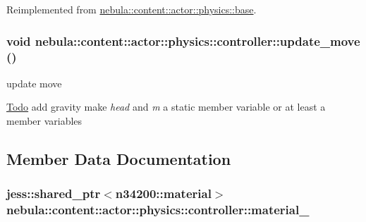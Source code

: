 Reimplemented from \hyperlink{classnebula_1_1content_1_1actor_1_1physics_1_1base_a468da70c6f6c2520b458662ab97b76e5}{nebula::content::actor::physics::base}.\hypertarget{classnebula_1_1content_1_1actor_1_1physics_1_1controller_ad2a4afb425a1aade9cbdd8ae8da99f47}{
\subsubsection[{update\_\-move}]{\setlength{\rightskip}{0pt plus 5cm}void nebula::content::actor::physics::controller::update\_\-move ()}}
\label{classnebula_1_1content_1_1actor_1_1physics_1_1controller_ad2a4afb425a1aade9cbdd8ae8da99f47}


update move 

\begin{Desc}
\item[\hyperlink{todo__todo000003}{Todo}]add gravity make {\itshape head\/} and {\itshape m\/} a static member variable or at least a member variables \end{Desc}


\subsection{Member Data Documentation}
\hypertarget{classnebula_1_1content_1_1actor_1_1physics_1_1controller_a58d0b48b283a21a2c8480f803a009351}{
\subsubsection[{material\_\-}]{\setlength{\rightskip}{0pt plus 5cm}jess::shared\_\-ptr$<${\bf n34200::material}$>$ {\bf nebula::content::actor::physics::controller::material\_\-}}}
\label{classnebula_1_1content_1_1actor_1_1physics_1_1controller_a58d0b48b283a21a2c8480f803a009351}


